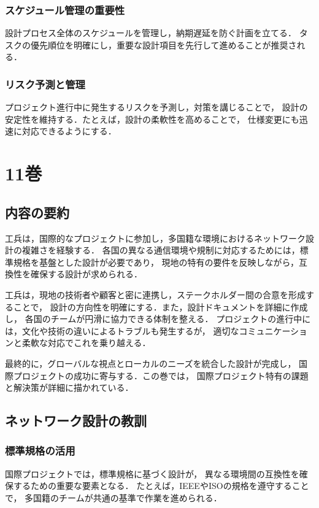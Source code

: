 \documentclass[titlepage,a4paper]{jsarticle}
\begin{document}
\subsubsection{スケジュール管理の重要性}
設計プロセス全体のスケジュールを管理し，納期遅延を防ぐ計画を立てる．
タスクの優先順位を明確にし，重要な設計項目を先行して進めることが推奨される．

\subsubsection{リスク予測と管理}
プロジェクト進行中に発生するリスクを予測し，対策を講じることで，
設計の安定性を維持する．たとえば，設計の柔軟性を高めることで，
仕様変更にも迅速に対応できるようにする．
\newpage
\section{11巻}
\subsection{内容の要約}
工兵は，国際的なプロジェクトに参加し，多国籍な環境におけるネットワーク設計の複雑さを経験する．
各国の異なる通信環境や規制に対応するためには，標準規格を基盤とした設計が必要であり，
現地の特有の要件を反映しながら，互換性を確保する設計が求められる．

工兵は，現地の技術者や顧客と密に連携し，ステークホルダー間の合意を形成することで，
設計の方向性を明確にする．また，設計ドキュメントを詳細に作成し，
各国のチームが円滑に協力できる体制を整える．
プロジェクトの進行中には，文化や技術の違いによるトラブルも発生するが，
適切なコミュニケーションと柔軟な対応でこれを乗り越える．

最終的に，グローバルな視点とローカルのニーズを統合した設計が完成し，
国際プロジェクトの成功に寄与する．この巻では，
国際プロジェクト特有の課題と解決策が詳細に描かれている．

\subsection{ネットワーク設計の教訓}
\subsubsection{標準規格の活用}
国際プロジェクトでは，標準規格に基づく設計が，
異なる環境間の互換性を確保するための重要な要素となる．
たとえば，IEEEやISOの規格を遵守することで，
多国籍のチームが共通の基準で作業を進められる．
\end{document}
